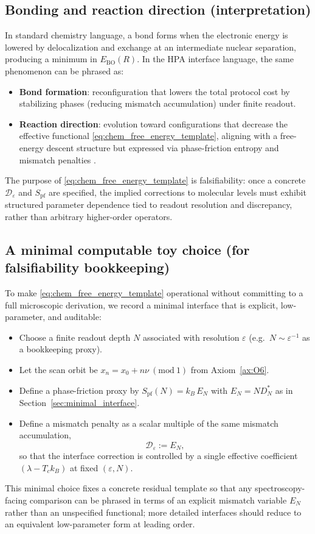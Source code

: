 \subsection{Bonding and reaction direction (interpretation)}
In standard chemistry language, a bond forms when the electronic energy is lowered by delocalization and exchange at an intermediate nuclear separation, producing a minimum in $E_{\mathrm{BO}}(R)$. In the HPA interface language, the same phenomenon can be phrased as:
\begin{itemize}
\item \textbf{Bond formation}: reconfiguration that lowers the total protocol cost by stabilizing phases (reducing mismatch accumulation) under finite readout.
\item \textbf{Reaction direction}: evolution toward configurations that decrease the effective functional \eqref{eq:chem_free_energy_template}, aligning with a free-energy descent structure but expressed via phase-friction entropy and mismatch penalties \cite{Ma2025HPT,Ma2025CAP}.
\end{itemize}
The purpose of \eqref{eq:chem_free_energy_template} is falsifiability: once a concrete $\mathcal{D}_\varepsilon$ and $S_{\mathrm{pf}}$ are specified, the implied corrections to molecular levels must exhibit structured parameter dependence tied to readout resolution and discrepancy, rather than arbitrary higher-order operators.

\subsection{A minimal computable toy choice (for falsifiability bookkeeping)}
To make \eqref{eq:chem_free_energy_template} operational without committing to a full microscopic derivation, we record a minimal interface that is explicit, low-parameter, and auditable:
\begin{itemize}
\item Choose a finite readout depth $N$ associated with resolution $\varepsilon$ (e.g.\ $N\sim \varepsilon^{-1}$ as a bookkeeping proxy).
\item Let the scan orbit be $x_n=x_0+n\nu\ (\mathrm{mod}\ 1)$ from Axiom~\ref{ax:O6}.
\item Define a phase-friction proxy by $S_{\mathrm{pf}}(N)=k_B\,E_N$ with $E_N=N D_N^\ast$ as in Section~\ref{sec:minimal_interface}.
\item Define a mismatch penalty as a scalar multiple of the same mismatch accumulation,
\[
\mathcal{D}_\varepsilon := E_N,
\]
so that the interface correction is controlled by a single effective coefficient $(\lambda - T_c k_B)$ at fixed $(\varepsilon,N)$.
\end{itemize}
This minimal choice fixes a concrete residual template so that any spectroscopy-facing comparison can be phrased in terms of an explicit mismatch variable $E_N$ rather than an unspecified functional; more detailed interfaces should reduce to an equivalent low-parameter form at leading order.


